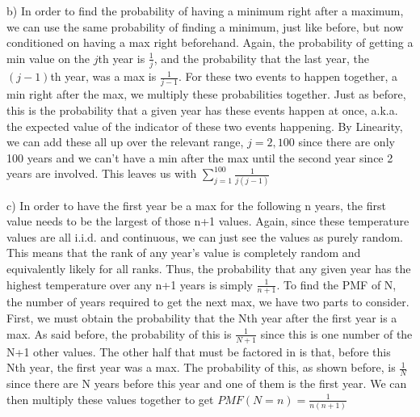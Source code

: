 \documentclass[11pt]{article}
\begin{document}
    b) In order to find the probability of having a minimum right after a maximum, we can use the same probability of finding a minimum, just like before, but now conditioned on having a max right beforehand.  Again, the probability of getting a min value on the $j$th year is $\frac{1}{j}$, and the probability that the last year, the $(j-1)$th year, was a max is $\frac{1}{j-1}$.  For these two events to happen together, a min right after the max, we multiply these probabilities together.  Just as before, this is the probability that a given year has these events happen at once, a.k.a. the expected value of the indicator of these two events happening.  By Linearity, we can add these all up over the relevant range, $j=2,100$ since there are only 100 years and we can't have a min after the max until the second year since 2 years are involved.  
    This leaves us with $\boxed{\sum^{100}_{j=1} \frac{1}{j(j-1)}}$
\smallskip

	c) In order to have the first year be a max for the following n years, the first value needs to be the largest of those n+1 values.  Again, since these temperature values are all i.i.d. and continuous, we can just see the values as purely random.  This means that the rank of any year's value is completely random and equivalently likely for all ranks.  Thus, the probability that any given year has the highest temperature over any n+1 years is simply $ \boxed{\frac{1}{n+1}}$.  
	To find the PMF of N, the number of years required to get the next max, we have two parts to consider.  First, we must obtain the probability that the Nth year after the first year is a max.  As said before, the probability of this is $\frac{1}{N+1}$ since this is one number of the N+1 other values.  The other half that must be factored in is that, before this Nth year, the first year was a max.  The probability of this, as shown before, is $\frac{1}{N}$ since there are N years before this year and one of them is the first year.  We can then multiply these values together to get $\boxed{PMF(N=n) = \frac{1}{n(n+1)}}$


\bigskip
\end{document}
